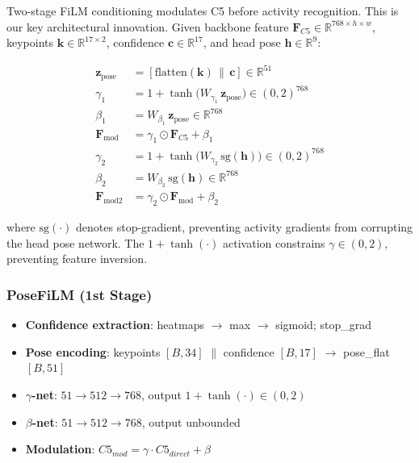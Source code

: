 \documentclass[10pt,twocolumn]{article}
\begin{document}
Two-stage FiLM conditioning modulates C5 before activity recognition. This is our key architectural innovation. Given backbone feature $\mathbf{F}_{C5} \in \mathbb{R}^{768 \times h \times w}$, keypoints $\mathbf{k} \in \mathbb{R}^{17 \times 2}$, confidence $\mathbf{c} \in \mathbb{R}^{17}$, and head pose $\mathbf{h} \in \mathbb{R}^{9}$:

\begin{align}
\mathbf{z}_{\text{pose}} &= [\text{flatten}(\mathbf{k}) \,\|\, \mathbf{c}] \in \mathbb{R}^{51} \label{eq:pose-flat}\\
\gamma_1 &= 1 + \tanh\bigl(W_{\gamma_1}\, \mathbf{z}_{\text{pose}}\bigr) \in (0,2)^{768} \label{eq:film-gamma}\\
\beta_1 &= W_{\beta_1}\, \mathbf{z}_{\text{pose}} \in \mathbb{R}^{768} \label{eq:film-beta}\\
\mathbf{F}_{\text{mod}} &= \gamma_1 \odot \mathbf{F}_{C5} + \beta_1 \label{eq:posefilm}\\[4pt]
\gamma_2 &= 1 + \tanh\bigl(W_{\gamma_2}\, \text{sg}(\mathbf{h})\bigr) \in (0,2)^{768} \label{eq:hpfilm-gamma}\\
\beta_2 &= W_{\beta_2}\, \text{sg}(\mathbf{h}) \in \mathbb{R}^{768} \label{eq:hpfilm-beta}\\
\mathbf{F}_{\text{mod2}} &= \gamma_2 \odot \mathbf{F}_{\text{mod}} + \beta_2 \label{eq:hpfilm}
\end{align}

where $\text{sg}(\cdot)$ denotes stop-gradient, preventing activity gradients from corrupting the head pose network. The $1 + \tanh(\cdot)$ activation constrains $\gamma \in (0, 2)$, preventing feature inversion.

\subsubsection{PoseFiLM (1st Stage)}

\begin{itemize}[nosep]
\item \textbf{Confidence extraction}: heatmaps $\rightarrow$ max $\rightarrow$ sigmoid; stop\_grad
\item \textbf{Pose encoding}: keypoints $[B, 34]$ $\|$ confidence $[B, 17]$ $\rightarrow$ pose\_flat $[B, 51]$
\item \textbf{$\gamma$-net}: $51 \rightarrow 512 \rightarrow 768$, output $1 + \tanh(\cdot) \in (0, 2)$
\item \textbf{$\beta$-net}: $51 \rightarrow 512 \rightarrow 768$, output unbounded
\item \textbf{Modulation}: $C5_{mod} = \gamma \cdot C5_{direct} + \beta$
\end{itemize}
\end{document}
